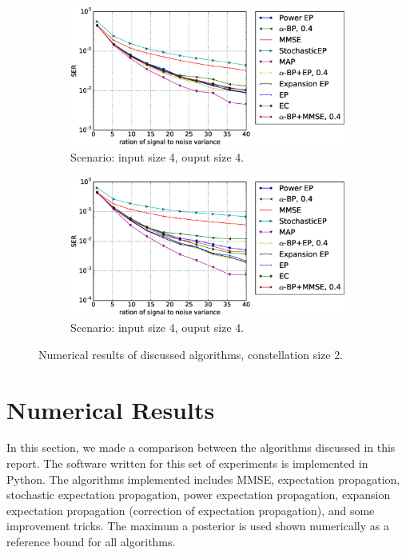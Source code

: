 \documentclass{article}
\begin{document}
\begin{figure}[!t]
  \begin{subfigure}{1\textwidth}
    \includegraphics[width=1\linewidth]{figures/ep_experiments_4by4_bpsk_alpha4.eps}
    \caption{Scenario: input size 4, ouput size 4.}
    \label{fig:compare-const2-44}
  \end{subfigure}
  \begin{subfigure}{1\textwidth}
    \includegraphics[width=1\linewidth]{figures/ep_experiments8by8_bpsk_alpha4.eps}
    \caption{Scenario: input size 4, ouput size 4.}
    \label{fig:compare-const2-88}
  \end{subfigure}
  \caption{Numerical results of discussed algorithms, constellation size 2.}
  \label{fig:compare-const2}
\end{figure}
\section{Numerical Results}


In this section, we made a comparison between the algorithms discussed in this report. The software written for this set of experiments is implemented in Python. The algorithms implemented includes MMSE, expectation propagation, stochastic expectation propagation, power expectation propagation, expansion expectation propagation (correction of expectation propagation), and some improvement tricks. The maximum a posterior is used shown numerically as a reference bound for all algorithms.
\end{document}
